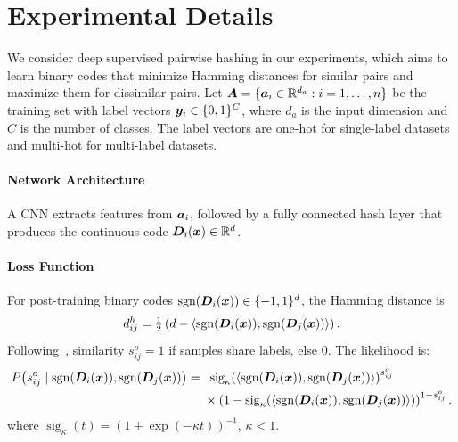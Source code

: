 \section{Experimental Details}
\label{app:experiments}

We consider deep supervised pairwise hashing in our experiments, which aims to learn binary codes that minimize Hamming distances for similar pairs and maximize them for dissimilar pairs. Let $\bm{A} = \{\bm{a}_i \in \mathbb{R}^{d_a} : i = 1, \ldots, n\}$ be the training set with label vectors $\bm{y}_i \in \{0,1\}^C$, where $d_a$ is the input dimension and $C$ is the number of classes. The label vectors are one-hot for single-label datasets and multi-hot for multi-label datasets.

\paragraph{Network Architecture}
A CNN extracts features from $\bm{a}_i$, followed by a fully connected hash layer that produces the continuous code $\bm{D}_i(\bm{x})\in\mathbb{R}^d$.

\paragraph{Loss Function}
For post-training binary codes $\operatorname{sgn}(\bm{D}_i(\bm{x}))\in\{-1,1\}^d$, the Hamming distance is
\begin{equation*}
 d_{ij}^h = \tfrac{1}{2}\left(d - \left\langle \operatorname{sgn}(\bm{D}_i(\bm{x})), \operatorname{sgn}(\bm{D}_j(\bm{x})) \right\rangle\right).
\end{equation*}
Following~\cite{xiaSupervisedHashingImage2014,laiSimultaneousFeatureLearning2015}, similarity $s^o_{ij} = 1$ if samples share labels, else $0$. The likelihood is:
\[
\begin{aligned}
P\bigl(s^o_{ij} \mid \operatorname{sgn}(\bm{D}_i(\bm{x})),\operatorname{sgn}(\bm{D}_j(\bm{x}))\bigr)
={}&\ \operatorname{sig}_{\kappa}\!\left(\left\langle \operatorname{sgn}(\bm{D}_i(\bm{x})),\operatorname{sgn}(\bm{D}_j(\bm{x})) \right\rangle\right)^{s^o_{ij}}\\
&\times\left(1 - \operatorname{sig}_{\kappa}\!\left(\left\langle \operatorname{sgn}(\bm{D}_i(\bm{x})),\operatorname{sgn}(\bm{D}_j(\bm{x})) \right\rangle\right)\right)^{1 - s^o_{ij}}.
\end{aligned}
\]
where $\operatorname{sig}_{\kappa}(t) = (1 + \exp(-\kappa t))^{-1}$, $\kappa < 1$.


